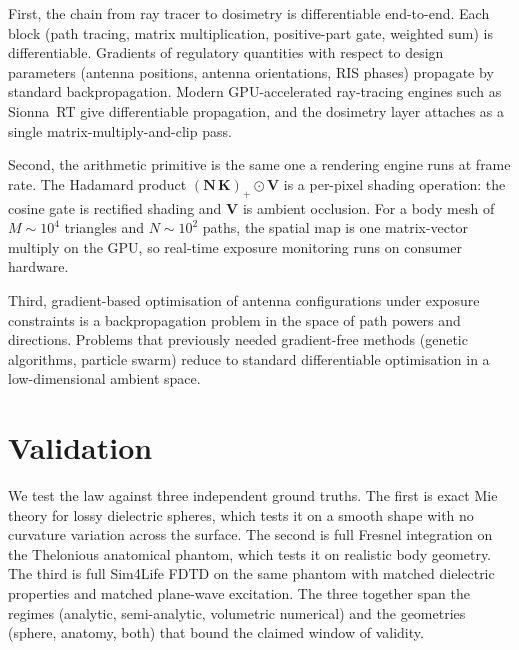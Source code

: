 \documentclass[journal,twocolumn,10pt]{IEEEtran}
\theoremstyle{plain}
\theoremstyle{remark}
\newcommand{\pospart}[1]{\left(#1\right)_{+}}
\begin{document}
First, the chain from ray tracer to dosimetry is differentiable
end-to-end. Each block (path tracing, matrix multiplication,
positive-part gate, weighted sum) is differentiable. Gradients of regulatory quantities
with respect to design parameters (antenna positions, antenna
orientations, RIS phases) propagate by standard backpropagation.
Modern GPU-accelerated ray-tracing engines such as Sionna~RT
\cite{SionnaRT} give differentiable propagation, and the
dosimetry layer attaches as a single matrix-multiply-and-clip pass.

Second, the arithmetic primitive is the same one a rendering engine
runs at frame rate. The Hadamard product
$\pospart{\mathbf{N}\,\mathbf{K}} \odot \mathbf{V}$ is a per-pixel
shading operation: the cosine gate is rectified shading and
$\mathbf{V}$ is ambient occlusion. For a body mesh of $M \sim 10^4$ triangles and
$N \sim 10^2$ paths, the spatial map is one matrix-vector multiply
on the GPU, so real-time exposure monitoring runs on
consumer hardware.

Third, gradient-based optimisation of antenna configurations under
exposure constraints is a backpropagation problem in the space of
path powers and directions. Problems that previously
needed gradient-free methods (genetic algorithms, particle
swarm) reduce to standard differentiable optimisation in a
low-dimensional ambient space.


\section{Validation}\label{sec:val}

We test the law against three independent ground truths.
The first is exact Mie theory for lossy dielectric spheres, which
tests it on a smooth shape with no curvature variation
across the surface. The second is full Fresnel integration on the
Thelonious anatomical phantom, which tests it on
realistic body geometry. The third is full Sim4Life FDTD on the same
phantom with matched dielectric properties and matched plane-wave
excitation. The three together span the regimes (analytic,
semi-analytic, volumetric numerical) and the geometries (sphere,
anatomy, both) that bound the claimed window of
validity.
\end{document}

